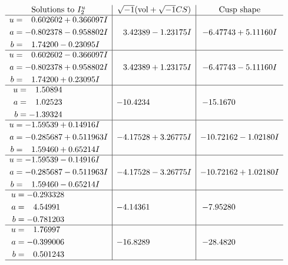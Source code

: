 \documentclass[1p]{elsarticle_modified}
\theoremstyle{definition}
\newcommand{\I}{\sqrt{-1}}
\begin{document}
$$\begin{array}{c|c|c}  
\text{Solutions to }I^u_{2}& \I (\text{vol} + \sqrt{-1}CS) & \text{Cusp shape}\\
 \hline 
\begin{aligned}
u &= \phantom{-}0.602602 + 0.366097 I \\
a &= -0.802378 - 0.958802 I \\
b &= \phantom{-}1.74200 - 0.23095 I\end{aligned}
 & \phantom{-}3.42389 - 1.23175 I & -6.47743 + 5.11160 I \\ \hline\begin{aligned}
u &= \phantom{-}0.602602 - 0.366097 I \\
a &= -0.802378 + 0.958802 I \\
b &= \phantom{-}1.74200 + 0.23095 I\end{aligned}
 & \phantom{-}3.42389 + 1.23175 I & -6.47743 - 5.11160 I \\ \hline\begin{aligned}
u &= \phantom{-}1.50894\phantom{ +0.000000I} \\
a &= \phantom{-}1.02523\phantom{ +0.000000I} \\
b &= -1.39324\phantom{ +0.000000I}\end{aligned}
 & -10.4234\phantom{ +0.000000I} & -15.1670\phantom{ +0.000000I} \\ \hline\begin{aligned}
u &= -1.59539 + 0.14916 I \\
a &= -0.285687 + 0.511963 I \\
b &= \phantom{-}1.59460 + 0.65214 I\end{aligned}
 & -4.17528 + 3.26775 I & -10.72162 - 1.02180 I \\ \hline\begin{aligned}
u &= -1.59539 - 0.14916 I \\
a &= -0.285687 - 0.511963 I \\
b &= \phantom{-}1.59460 - 0.65214 I\end{aligned}
 & -4.17528 - 3.26775 I & -10.72162 + 1.02180 I \\ \hline\begin{aligned}
u &= -0.293328\phantom{ +0.000000I} \\
a &= \phantom{-}4.54991\phantom{ +0.000000I} \\
b &= -0.781203\phantom{ +0.000000I}\end{aligned}
 & -4.14361\phantom{ +0.000000I} & -7.95280\phantom{ +0.000000I} \\ \hline\begin{aligned}
u &= \phantom{-}1.76997\phantom{ +0.000000I} \\
a &= -0.399006\phantom{ +0.000000I} \\
b &= \phantom{-}0.501243\phantom{ +0.000000I}\end{aligned}
 & -16.8289\phantom{ +0.000000I} & -28.4820\phantom{ +0.000000I}\\
 \hline 
 \end{array}$$\newpage\newpage\renewcommand{\arraystretch}{1}
\end{document}
